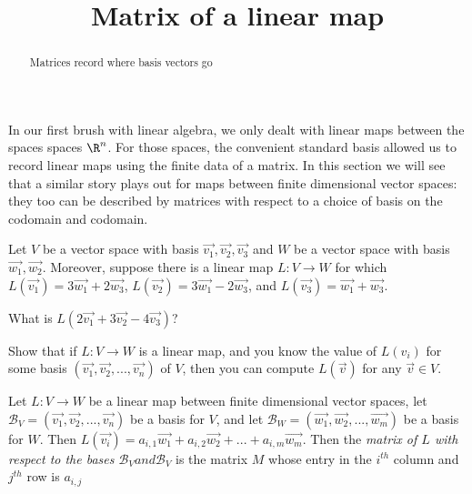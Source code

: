 \documentclass{ximera}
\title{Matrix of a linear map}
\begin{document}
\begin{abstract}
	Matrices record where basis vectors go
\end{abstract}

In our first brush with linear algebra, we only dealt with linear maps between the spaces spaces $\R^n$.  For those spaces, the convenient 
standard basis allowed us to record linear maps using the finite data of a matrix.  In this section we will see that a similar story plays out for
maps between finite dimensional vector spaces:  they too can be described by matrices with respect to a choice of basis on the codomain and codomain.

\begin{question}
	Let $V$ be a vector space with basis $\vec{v_1},\vec{v_2},\vec{v_3}$ and $W$ be a vector space with basis $\vec{w_1},\vec{w_2}$.
	Moreover, suppose there is a linear map $L: V \to W$ for which $L(\vec{v_1}) = 3\vec{w_1} + 2\vec{w_3}$, 
	$L(\vec{v_2}) = 3\vec{w_1} - 2\vec{w_3}$, and $L(\vec{v_3}) = \vec{w_1} + \vec{w_3}$.
	
	What is $L(2\vec{v_1}+3\vec{v_2}-4\vec{v_3})$?
\end{question}

\begin{question}
	Show that if $L:V \to W$ is a linear map, and you know the value of $L(v_i)$ for some basis $(\vec{v_1},\vec{v_2},...,\vec{v_n})$ of $V$, 
	then you can compute $L(\vec{v})$ for any $\vec{v} \in V$.
\end{question}

\begin{definition}
	Let $L:V \to W$ be a linear map between finite dimensional vector spaces,  let $\mathcal{B}_V  =(\vec{v_1},\vec{v_2},...,\vec{v_n}) $ be
	a basis for $V$, and let $\mathcal{B}_W = (\vec{w_1},\vec{w_2},...,\vec{w_m})$  be a basis for $W$.  
	Then $L(\vec{v_i}) = a_{i,1}\vec{w_1}+a_{i,2}\vec{w_2} +...+ a_{i,m}\vec{w_m}$.
	Then the \textit{matrix of $L$ with respect to the bases
	$\mathcal{B}_V and \mathcal{B}_V$} is the matrix $M$ whose entry in the $i^{th}$ column and $j^{th}$ row is $a_{i,j}$
\end{definition}
\end{document}
